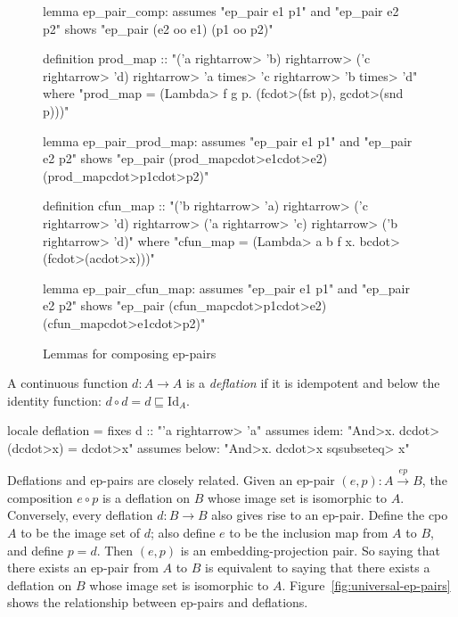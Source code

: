 \begin{figure}
\begin{isacode}
lemma ep_pair_comp:
  assumes "ep_pair e1 p1" and "ep_pair e2 p2"
  shows "ep_pair (e2 oo e1) (p1 oo p2)"
\end{isacode}
\unmedskip
{}
\begin{isacode}
definition prod_map :: "('a \<rightarrow> 'b) \<rightarrow> ('c \<rightarrow> 'd) \<rightarrow> 'a \<times> 'c \<rightarrow> 'b \<times> 'd"
  where "prod_map = (\<Lambda> f g p. (f\<cdot>(fst p), g\<cdot>(snd p)))"
\end{isacode}
\unmedskip
{}
\begin{isacode}
lemma ep_pair_prod_map:
  assumes "ep_pair e1 p1" and "ep_pair e2 p2"
  shows "ep_pair (prod_map\<cdot>e1\<cdot>e2) (prod_map\<cdot>p1\<cdot>p2)"
\end{isacode}
\unmedskip
{}
\begin{isacode}
definition cfun_map :: "('b \<rightarrow> 'a) \<rightarrow> ('c \<rightarrow> 'd) \<rightarrow> ('a \<rightarrow> 'c) \<rightarrow> ('b \<rightarrow> 'd)"
  where "cfun_map = (\<Lambda> a b f x. b\<cdot>(f\<cdot>(a\<cdot>x)))"
\end{isacode}
\unmedskip
{}
\begin{isacode}
lemma ep_pair_cfun_map:
  assumes "ep_pair e1 p1" and "ep_pair e2 p2"
  shows "ep_pair (cfun_map\<cdot>p1\<cdot>e2) (cfun_map\<cdot>e1\<cdot>p2)"
\end{isacode}
\caption{Lemmas for composing ep-pairs}
\label{fig:universal-ep-pair-lemmas}
\end{figure}

A continuous function $d : A \to A$ is a \emph{deflation} if it is idempotent and below the identity function: $d \circ d = d \sqsubseteq \mathrm{Id}_A$.
\pagebreak

\begin{isacode}
locale deflation =
  fixes d :: "'a \<rightarrow> 'a"
  assumes idem: "\<And>x. d\<cdot>(d\<cdot>x) = d\<cdot>x"
  assumes below: "\<And>x. d\<cdot>x \<sqsubseteq> x"
\end{isacode}
%
Deflations and ep-pairs are closely related. Given an ep-pair $(e, p) : A \stackrel{ep}{\to} B$, the composition $e \circ p$ is a deflation on $B$ whose image set is isomorphic to $A$. Conversely, every deflation $d : B \rightarrow B$ also gives rise to an ep-pair. Define the cpo $A$ to be the image set of $d$; also define $e$ to be the inclusion map from $A$ to $B$, and define $p = d$. Then $(e, p)$ is an embedding-projection pair. So saying that there exists an ep-pair from $A$ to $B$ is equivalent to saying that there exists a deflation on $B$ whose image set is isomorphic to $A$. Figure~\ref{fig:universal-ep-pairs} shows the relationship between ep-pairs and deflations.

